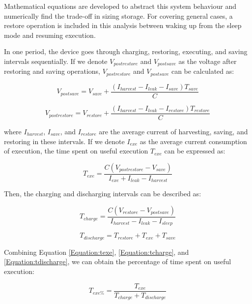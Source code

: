 Mathematical equations are developed to abstract this system behaviour and numerically find the trade-off in sizing storage. For covering general cases, a restore operation is included in this analysis between waking up from the sleep mode and resuming execution. 

In one period, the device goes through charging, restoring, executing, and saving intervals sequentially. If we denote $V_{postrestore}$ and $V_{postsave}$ as the voltage after restoring and saving operations, $V_{postrestore}$ and $V_{postsave}$ can be calculated as:

\begin{equation}
    V_{postsave} = V_{save} + \frac{(I_{harvest} - I_{leak} - I_{save}) T_{save}}{C}
    \label{Equation:Vpostsave}
\end{equation}

\begin{equation}
    V_{postrestore} = V_{restore} + \frac{(I_{harvest} - I_{leak} - I_{restore}) T_{restore}}{C}
    \label{Equation:Vpostrestore}
\end{equation}

where $I_{harvest}$, $I_{save}$, and $I_{restore}$ are the average current of harvesting, saving, and restoring in these intervals. If we denote $I_{exe}$ as the average current consumption of execution, the time spent on useful execution $T_{exe}$ can be expressed as:

\begin{equation}
    T_{exe} = \frac{C(V_{postrestore} - V_{save})}{I_{exe} + I_{leak} - I_{harvest}}
    \label{Equation:texe}
\end{equation}

Then, the charging and discharging intervals can be described as:

\begin{equation}
    T_{charge} = \frac{C(V_{restore} - V_{postsave})}{I_{harvest} - I_{leak} - I_{sleep}}
    \label{Equation:tcharge}
\end{equation}

\begin{equation}
    T_{discharge} = T_{restore} + T_{exe} + T_{save}
    \label{Equation:tdischarge}
\end{equation}

Combining Equation \ref{Equation:texe}, \ref{Equation:tcharge}, and \ref{Equation:tdischarge}, we can obtain the percentage of time spent on useful execution:

\begin{equation}
    T_{exe\%} = \frac{T_{exe}}{T_{charge} + T_{discharge}}
\end{equation}

